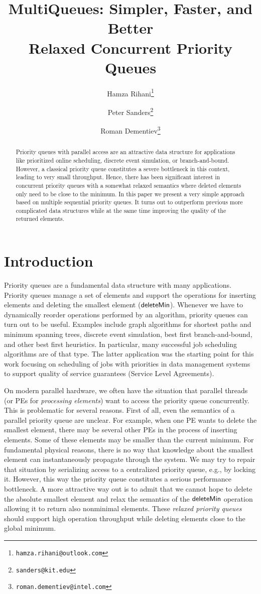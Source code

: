 \documentclass[a4paper,12pt]{article}
\title{MultiQueues: Simpler, Faster, and Better\\ Relaxed Concurrent Priority Queues}
\author[1]{Hamza Rihani\thanks{\tt hamza.rihani@outlook.com}}
\author[2]{Peter Sanders\thanks{{\tt sanders@kit.edu}}}
\author[3]{Roman Dementiev\thanks{{\tt roman.dementiev@intel.com}}}
\affil[1]{Universit\'e Joseph Fourier Grenoble, France}
\affil[2]{Karlsruhe Institute of Technology, Germany}
\affil[3]{Intel GmbH Munich, Germany}
\newcommand{\Id}[1]{\ensuremath{\text{{\sf #1}}}}
\begin{document}
\maketitle
\pagestyle{plain}

\begin{abstract}
Priority queues with parallel access are an attractive data structure for applications like prioritized online scheduling, discrete event simulation, or branch-and-bound. However, a classical priority queue constitutes a severe bottleneck in this context, leading to very small throughput. Hence, there has been significant interest in concurrent priority queues with a somewhat relaxed semantics where deleted elements only need to be close to the minimum. In this paper
we present a very simple approach based on multiple sequential priority queues.
It turns out to outperform previous more complicated data structures while at the same time improving the quality of the returned elements.
\end{abstract}

\section{Introduction}
\label{s:intro}

Priority queues are a fundamental data structure with many applications.
Priority queues manage a set of elements and support the operations for inserting elements and deleting the smallest element (\Id{deleteMin}).
Whenever we have to dynamically reorder operations performed by an algorithm, priority queues can turn out to be useful. Examples include graph algorithms for shortest paths and minimum spanning trees, discrete event simulation, best first branch-and-bound, and other best first heuristics. In particular, many successful job scheduling algorithms are of that type. The latter application was the starting point for this work focusing on scheduling of jobs with priorities in data management systems to support quality of service guarantees (Service Level Agreements).

On modern parallel hardware, we often have the situation that  parallel threads (or PEs for \emph{processing   elements}) want to access the priority queue concurrently. This is problematic for several reasons. First of all, even the semantics of a parallel priority queue are unclear. For example, when one PE wants to delete the smallest element, there may be several other PEs in the process of inserting elements. Some of these elements may be smaller than the current minimum. For fundamental physical reasons, there is no way that knowledge about the smallest element can instantaneously propagate through the system. We may try to repair that situation by serializing access to a centralized priority queue, e.g., by locking it. However, this way the priority queue constitutes a serious performance bottleneck. A more attractive way out is to admit that we cannot hope to delete the absolute smallest element and relax the semantics of the \Id{deleteMin} operation allowing it to return also nonminimal elements. These \emph{relaxed priority queues} should support high operation throughput while deleting elements close to the global minimum. 
\end{document}
